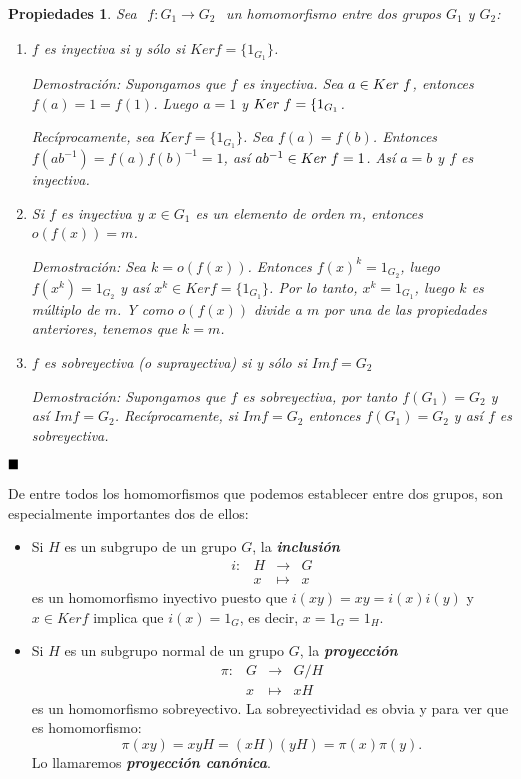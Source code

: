 \documentclass[12pt]{article}
\newtheorem{properties}{Propiedades}[theorem]
\begin{document}
\begin{properties} Sea $
\begin{array}{rccl}
f\colon G_{1} \longrightarrow  G_{2}
\end{array}
$ un homomorfismo entre dos grupos $G_{1}$ y $G_{2}$:
\begin{enumerate}
\item $f$ es inyectiva si y sólo si $Ker f = \lbrace 1_{G_{1}}\rbrace$. 

\emph{Demostración: } Supongamos que $f$ es inyectiva. Sea $a \in Ker \hspace{0.1cm} f$, entonces $f(a)=1 = f(1)$. Luego $a=1$ y $Ker \hspace{0.1cm}f = \lbrace 1_{G_{1}}$. 

Recíprocamente, sea $Ker f = \lbrace 1_{G_{1}}\rbrace$. Sea $f(a)=f(b)$. Entonces $f(ab^{-1}) = f(a)f(b)^{-1} = 1$, así $ab^{-1} \in Ker \hspace{0.1cm} f = 1$. Así $a=b$ y $f$ es inyectiva.
\item Si $f$ es inyectiva y $x \in G_{1}$ es un elemento de orden $m$, entonces $o(f(x)) = m$.

\emph{Demostración: } Sea $k = o(f(x))$. Entonces $f(x)^{k} = 1_{G_{2}}$, luego $f(x^{k}) = 1_{G_{2}}$ y así $x^{k} \in Ker f = \lbrace 1_{G_{1}} \rbrace$. Por lo tanto, $x^{k} = 1_{G_{1}}$, luego $k$ es múltiplo de $m$. Y como $o(f(x))$ divide a $m$ por una de las propiedades anteriores, tenemos que $k = m$.
\item $f$ es sobreyectiva (o suprayectiva) si y sólo si $Im f = G_{2}$

\emph{Demostración: } Supongamos que $f$ es sobreyectiva, por tanto $f(G_{1}) = G_{2}$ y así $Im f = G_{2}$. Recíprocamente, si $Im f = G_{2}$ entonces $f(G_{1}) = G_{2}$ y así $f$ es sobreyectiva.
\end{enumerate}
\end{properties}
$\hfill \blacksquare$

De entre todos los homomorfismos que podemos establecer entre dos grupos, son especialmente importantes dos de ellos: 

\begin{itemize}
\item Si $H$ es un subgrupo de un grupo $G$, la \textbf{\textit{inclusión}} $$\begin{array}{rccl}
i \colon &H & \longrightarrow & G\\
&x & \longmapsto &x
\end{array}
$$ es un homomorfismo inyectivo puesto que $i(xy) = xy = i(x)i(y)$ y $x \in Ker f$ implica que $i(x) = 1_{G}$, es decir, $x = 1_{G} = 1_{H}$.
\item Si $H$ es un subgrupo normal de un grupo $G$, la \textbf{\textit{proyección}} $$\begin{array}{rccl}
\pi \colon &G & \longrightarrow & G/H\\
&x & \longmapsto &xH
\end{array}
$$ es un homomorfismo sobreyectivo. La sobreyectividad es obvia y para ver que es homomorfismo: $$\pi (xy) = xyH = (xH)(yH) = \pi (x) \pi (y).$$ Lo llamaremos \textbf{\textit{proyección canónica}}.
\end{itemize}
\end{document}
